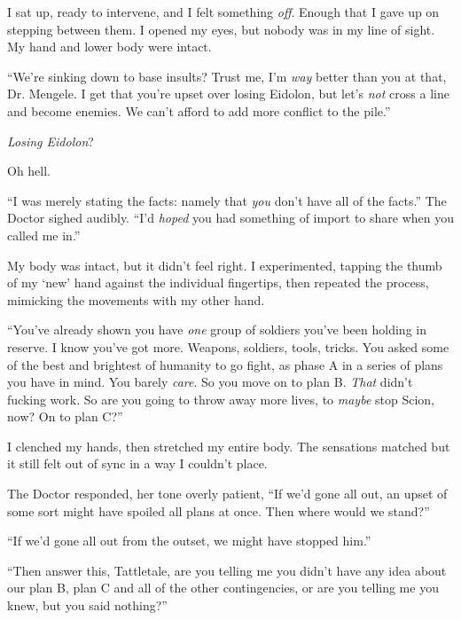 I sat up, ready to intervene, and I felt something \emph{off}.  Enough that I gave up on stepping between them.  I opened my eyes, but nobody was in my line of sight.  My hand and lower body were intact.



``We're sinking down to base insults?  Trust me, I'm \emph{way} better than you at that, Dr. Mengele.  I get that you're upset over losing Eidolon, but let's \emph{not} cross a line and become enemies.  We can't afford to add more conflict to the pile.''



\emph{Losing Eidolon}?



Oh hell.



``I was merely stating the facts: namely that \emph{you} don't have all of the facts.''  The Doctor sighed audibly.  ``I'd \emph{hoped} you had something of import to share when you called me in.''



My body was intact, but it didn't feel right.  I experimented, tapping the thumb of my `new' hand against the individual fingertips, then repeated the process, mimicking the movements with my other hand.



``You've already shown you have \emph{one} group of soldiers you've been holding in reserve.  I know you've got more.  Weapons, soldiers, tools, tricks.  You asked some of the best and brightest of humanity to go fight, as phase A in a series of plans you have in mind.  You barely \emph{care}.  So you move on to plan B.  \emph{That} didn't fucking work.  So are you going to throw away more lives, to \emph{maybe} stop Scion, now?  On to plan C?''



I clenched my hands, then stretched my entire body.  The sensations matched but it still felt out of sync in a way I couldn't place.



The Doctor responded, her tone overly patient, ``If we'd gone all out, an upset of some sort might have spoiled all plans at once. Then where would we stand?''



``If we'd gone all out from the outset, we might have stopped him.''



``Then answer this, Tattletale, are you telling me you didn't have any idea about our plan B, plan C and all of the other contingencies, or are you telling me you knew, but you said nothing?''



